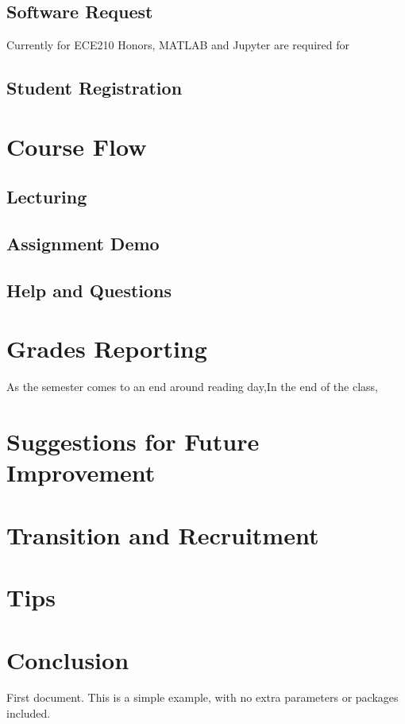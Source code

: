 \documentclass[12pt]{article}
\begin{document}
    \subsection{Software Request}
        Currently for ECE210 Honors, MATLAB and Jupyter are required for 
    \subsection{Student Registration}
\newpage

\section{Course Flow}
    \subsection{Lecturing}
    \subsection{Assignment Demo}
    \subsection{Help and Questions}
\newpage

\section{Grades Reporting}
    As the semester comes to an end around reading day,In the end of the class, 
\newpage

\section{Suggestions for Future Improvement}

\newpage

\section{Transition and Recruitment}
\newpage

\section{Tips}


\newpage

\section{Conclusion}



   First document. This is a simple example, with no 
   extra parameters or packages included.
\end{document}

